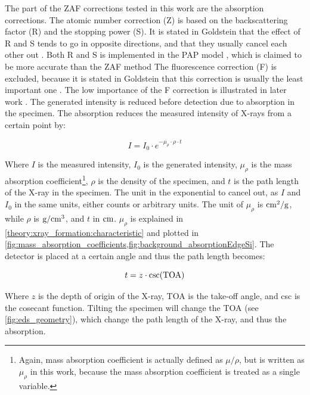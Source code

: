 The part of the ZAF corrections tested in this work are the absorption corrections.
The atomic number correction (Z) is based on the backscattering factor (R) and the stopping power (S).
It is stated in Goldstein that the effect of R and S tends to go in opposite directions, and that they usually cancel each other out \cite[p. 300]{goldstein_scanning_2018}.
Both R and S is implemented in the PAP model \cite{pap_1991}, which is claimed to be more accurate than the ZAF method \cite{pap_1991,bastin_proza96_1998,goldstein_scanning_2018}
The fluorescence correction (F) is excluded, because it is stated in Goldstein that this correction is usually the least important one \cite[p. 307]{goldstein_scanning_2018}.
The low importance of the F correction is illustrated in later work \cite{burdet_2014_3dsem}.
The generated intensity is reduced before detection due to absorption in the specimen.
The absorption reduces the measured intensity of X-rays from a certain point by:

\begin{equation}
    \label{eq:theory:quantitative:absorption}
    I = I_0 \cdot e^{-\mu_{\rho} \cdot \rho \cdot t}
\end{equation}

Where $I$ is the measured intensity, $I_0$ is the generated intensity, $\mu_{\rho}$ is the mass absorption coefficient\footnote{Again, mass absorption coefficient is actually defined as $\mu/\rho$, but is written as $\mu_\rho$ in this work, because the mass absorption coefficient is treated as a single variable.},
$\rho$ is the density of the specimen, and $t$ is the path length of the X-ray in the specimen.
The unit in the exponential to cancel out, as $I$ and $I_0$ in the same units, either counts or arbitrary units.
The unit of $\mu_{\rho}$ is $\textnormal{cm}^2/\textnormal{g}$, while $\rho$ is $\textnormal{g}/\textnormal{cm}^3$, and $t$ in $\textnormal{cm}$.
$\mu_{\rho}$ is explained in \cref{theory:xray_formation:characteristic} and plotted in \cref{fig:mass_absorption_coefficients,fig:background_absorptionEdgeSi}.
The detector is placed at a certain angle and thus the path length becomes:

\begin{equation}
    \label{eq:theory:quantitative:path_length}
    t = z \cdot \csc(\textnormal{TOA})
\end{equation}

Where $z$ is the depth of origin of the X-ray, TOA is the take-off angle, and csc is the cosecant function.
Tilting the specimen will change the TOA (see \cref{fig:eds_geometry}), which change the path length of the X-ray, and thus the absorption.

